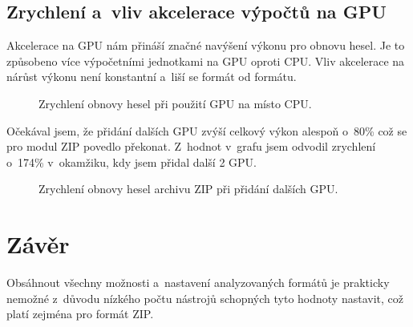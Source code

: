 \section{Zrychlení a~vliv akcelerace výpočtů na GPU}
\label{sec:zrychleni}
Akcelerace na GPU nám přináší značné navýšení výkonu pro obnovu hesel. Je to způsobeno více
výpočetními jednotkami na GPU oproti CPU. Vliv akcelerace na nárůst výkonu není konstantní a~liší
se formát od formátu.
\begin{figure}[!ht]
    \begin{center}
	\caption{Zrychlení obnovy hesel při použití GPU na místo CPU.}
	\label{memory}
    \end{center}
\end{figure}
Očekával jsem, že přidání dalších GPU zvýší celkový výkon alespoň o~80\% což se pro modul ZIP
povedlo překonat. Z~hodnot v~grafu jsem odvodil zrychlení o~174\% v~okamžiku, kdy jsem přidal další
2 GPU.
\begin{figure}[!ht]
    \begin{center}
	\caption{Zrychlení obnovy hesel archivu ZIP při přidání dalších GPU.}
	\label{memory}
    \end{center}
\end{figure}

\chapter{Závěr}
Obsáhnout všechny možnosti a~nastavení analyzovaných formátů je prakticky nemožné z~důvodu nízkého
počtu nástrojů schopných tyto hodnoty nastavit, což platí zejména pro formát ZIP.

